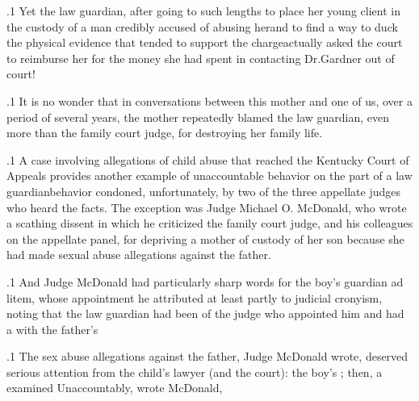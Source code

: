 \documentclass[11pt, twoside]{article}
\begin{document}
{\p.1{%
Yet the law guardian, after going to such lengths to place her young
client in the custody of a man credibly accused of abusing her\mdash{}and
to find a way to duck the physical evidence that tended to support the
charge\mdash{}actually asked the court to reimburse her for the money she
had spent in contacting Dr.\@ Gardner out of court!
}%

\p.1{%
It is no wonder that in conversations between this mother and one
of us, over a period of several years, the mother repeatedly blamed the
law guardian, even more than the family court judge, for destroying her
family life.
}%

\p.1{%
A case involving allegations of child abuse that reached the Kentucky
Court of Appeals provides another example of unaccountable behavior
on the part of a law guardian\mdash{}behavior condoned, unfortunately, by
two of the three appellate judges who heard the facts. The exception
was Judge Michael O. McDonald, who wrote a scathing dissent in which
he criticized the family court judge, and his colleagues on the appellate
panel, for depriving a mother of custody of her son because she had
made sexual abuse allegations against the father.
}%

\p.1{%
And Judge McDonald had particularly sharp words for the boy’s
guar\-dian ad litem, whose appointment he attributed at least partly to
judicial cronyism, noting that the law guardian had been  of the judge who appointed him and had a  with the father’s 
}%

\p.1{%
The sex abuse allegations against the father, Judge McDonald wrote,
deserved serious attention from the child’s lawyer (and the court):
the boy’s ; then, a
 examined 
Unaccountably, wrote McDonald, 
}%

}
\end{document}
